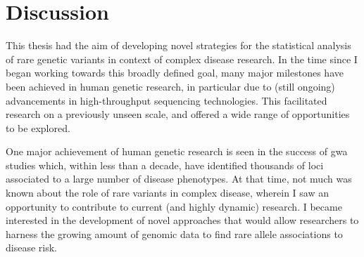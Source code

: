 
\glsresetall




{
\singlespacing
\chapter{Discussion}
\label{ch:discussion}
\minitoc
}





%
%
%
%
%
%
%
%
%
%
%



This thesis had the aim of developing novel strategies for the statistical analysis of rare genetic variants in context of complex disease research.
In the time since I began working towards this broadly defined goal, many major milestones have been achieved in human genetic research, in particular due to (still ongoing) advancements in high-throughput sequencing technologies.
This facilitated research on a previously unseen scale, and offered a wide range of opportunities to be explored.

One major achievement of human genetic research is seen in the success of \gls{gwa} studies which, within less than a decade, have identified thousands of loci associated to a large number of disease phenotypes.
At that time, not much was known about the role of rare variants in complex disease, wherein I saw an opportunity to contribute to current (and highly dynamic) research.
I became interested in the development of novel approaches that would allow researchers to harness the growing amount of genomic data to find rare allele associations to disease risk.

